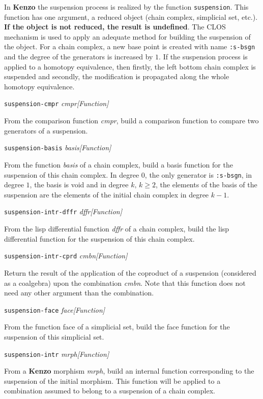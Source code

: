 In {\bf Kenzo} the suspension process is realized by the function {\tt suspension}.
This function has one argument, a reduced  object (chain complex, simplicial set, etc.).
{\bf If the object is not reduced, the result is undefined}.
The CLOS mechanism is used to apply an adequate method for building the suspension of the object.
For a chain complex, a new base point is created with name {\tt :s-bsgn} and the degree of the generators
is increased by $1$. If the suspension process is applied to a homotopy equivalence, then firstly, 
the left bottom chain complex is suspended and secondly, the modification is propagated along 
the  whole homotopy equivalence.
\par
\vskip 0.40cm
{\parindent=0mm
{\leftskip=5mm 
{\tt suspension-cmpr} {\em cmpr}\hfill{\em[Function]} \par}
{\leftskip=15mm 
From the comparison function {\em cmpr}, build a comparison function to compare
two generators of a suspension. \par}
{\leftskip=5mm 
{\tt suspension-basis} {\em basis}\hfill{\em[Function]} \par}
{\leftskip=15mm 
From the function {\em basis} of  a chain complex, build a basis function for
the suspension of this chain complex. In degree $0$, the only generator is {\tt :s-bsgn},
in degree $1$, the basis is void and in degree $k,\,k\ge 2$, the elements of the basis of
the suspension are the elements of the initial chain complex in degree $k-1$. \par}
{\leftskip=5mm 
{\tt suspension-intr-dffr} {\em dffr}\hfill{\em[Function]} \par}
{\leftskip=15mm 
From the lisp differential function {\em dffr} of a chain complex, build the
lisp differential function for the suspension of this chain complex. \par}
{\leftskip=5mm 
{\tt suspension-intr-cprd} {\em cmbn}\hfill{\em[Function]} \par}
{\leftskip=15mm 
Return the result of the  application of the coproduct of a suspension 
(considered as a coalgebra) upon the combination {\em cmbn}. Note that
this function does not need any other argument than the combination. \par}
{\leftskip=5mm 
{\tt suspension-face} {\em face}\hfill{\em[Function]} \par}
{\leftskip=15mm 
From the function face of a simplicial set, build the face function
for the suspension of this simplicial set. \par}
{\leftskip=5mm 
{\tt suspension-intr} {\em mrph}\hfill{\em[Function]} \par}
{\leftskip=15mm 
From a {\bf Kenzo} morphism {\em mrph}, build an internal function 
cor\-res\-pon\-ding to the suspension of the initial morphism. This function
will be applied to a combination assumed to belong to a suspension
of a chain complex. \par}
}
